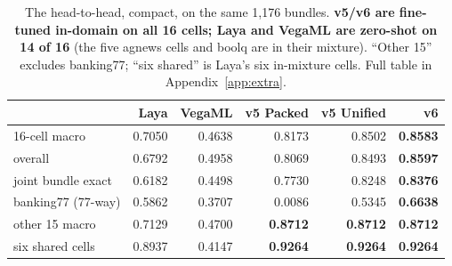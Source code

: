 \begin{table}[t]
\centering
\footnotesize
\setlength{\tabcolsep}{4pt}
\caption{The head-to-head, compact, on the same 1{,}176 bundles. \textbf{v5/v6 are
fine-tuned in-domain on all 16 cells; Laya and VegaML are zero-shot on 14 of 16}
(the five agnews cells and boolq are in their mixture). “Other 15” excludes
banking77; “six shared” is Laya's six in-mixture cells. Full table in
Appendix~\ref{app:extra}.}
\label{tab:compact}
\begin{tabular}{lrrrrr}
\toprule
 & Laya & VegaML & v5 Packed & v5 Unified & v6 \\
\midrule
16-cell macro & 0.7050 & 0.4638 & 0.8173 & 0.8502 & \textbf{0.8583} \\
overall & 0.6792 & 0.4958 & 0.8069 & 0.8493 & \textbf{0.8597} \\
joint bundle exact & 0.6182 & 0.4498 & 0.7730 & 0.8248 & \textbf{0.8376} \\
banking77 (77-way) & 0.5862 & 0.3707 & 0.0086 & 0.5345 & \textbf{0.6638} \\
other 15 macro & 0.7129 & 0.4700 & \textbf{0.8712} & \textbf{0.8712} & \textbf{0.8712} \\
six shared cells & 0.8937 & 0.4147 & \textbf{0.9264} & \textbf{0.9264} & \textbf{0.9264} \\
\bottomrule
\end{tabular}
\end{table}
